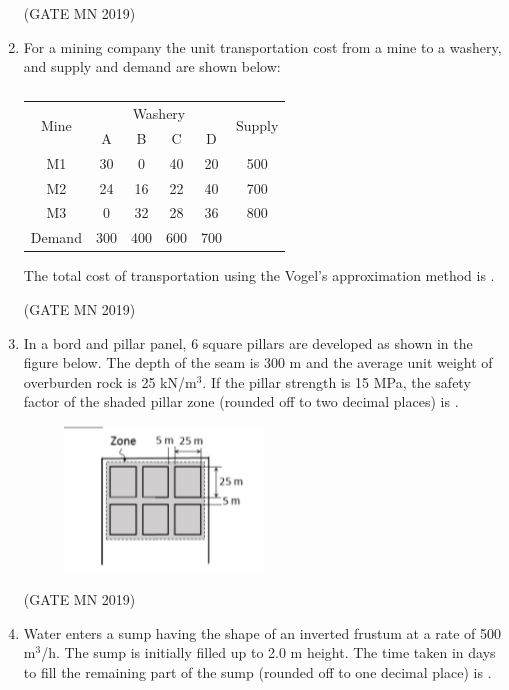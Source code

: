 \documentclass[journal]{IEEEtran}
\begin{document}
\begin{enumerate}
	\hfill(GATE MN 2019)

\item For a mining company the unit transportation cost from a mine to a washery, and supply and demand are shown below:

\begin{table}[H]
\centering
\begin{tabular}{|c|c|c|c|c|c|}
\hline
\multirow{2}{*}{Mine} & \multicolumn{4}{c|}{Washery} & \multirow{2}{*}{Supply} \\ \cline{2-5}
 & A & B & C & D & \\ \hline
M1 & 30 & 0  & 40 & 20 & 500 \\ \hline
M2 & 24 & 16 & 22 & 40 & 700 \\ \hline
M3 & 0  & 32 & 28 & 36 & 800 \\ \hline
Demand & 300 & 400 & 600 & 700 & \\ \hline
\end{tabular}
	\caption{}
	\label{tab:Q57}
\end{table}


The total cost of transportation using the Vogel’s approximation method is \underline{\hspace{3cm}}.


\hfill(GATE MN 2019)

\item In a bord and pillar panel, 6 square pillars are developed as shown in the figure below. The depth of the seam is 300 m and the average unit weight of overburden rock is 25 kN/m$^3$. If the pillar strength is 15 MPa, the safety factor of the shaded pillar zone (rounded off to two decimal places) is \underline{\hspace{3cm}}.


\begin{figure}[H]
    \centering
        \includegraphics[width=0.5\textwidth]{Screenshot_2025_0818_154544.png}
	    \caption{}
    \label{fig:Q58}
    \end{figure}


    \hfill(GATE MN 2019)
\item Water enters a sump having the shape of an inverted frustum at a rate of 500 m$^3$/h. The sump is initially filled up to 2.0 m height. The time taken in days to fill the remaining part of the sump (rounded off to one decimal place) is \underline{\hspace{3cm}}.



\end{enumerate}
\end{document}
